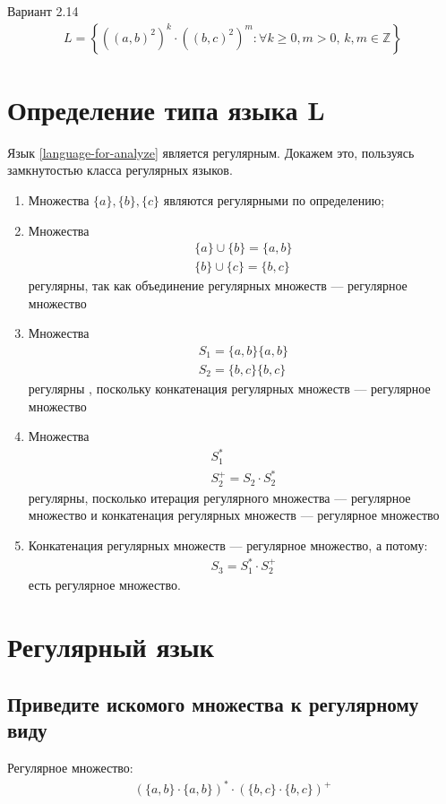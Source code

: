 Вариант 2.14
\begin{align}\label{language-for-analyze}
	L = \left\{ ((a,b)^2)^k \cdot ((b,c)^2)^m \colon \forall k \geq 0, m > 0,\, k,m \in \mathbb{Z} \right\}
\end{align}
\section{Определение типа языка L}
Язык \cref{language-for-analyze} является регулярным. Докажем это, пользуясь замкнутостью класса регулярных языков.
\begin{enumerate}
	\item Множества \(\{a\}, \{b\}, \{c\}\) являются регулярными по определению;
	\item Множества
	      \begin{align}
		      \{a\} \cup \{b\} =  \{a,b\} \\
		      \{b\} \cup \{c\} =  \{b,c\}
	      \end{align}
	      регулярны, так как объединение регулярных множеств --- регулярное множество
	\item Множества \begin{align}
		      S_1 = \{a, b\}\{a,b\} \\
		      S_2 = \{b, c\}\{b,c\}
	      \end{align}
	      регулярны , поскольку конкатенация регулярных множеств --- регулярное множество
	\item Множества
	      \begin{align}
		      S_1^* \\
		      S_2^+ = S_2 \cdot S_2^*
	      \end{align}
	      регулярны, посколько итерация регулярного множества --- регулярное множество и конкатенация регулярных множеств --- регулярное множество
	\item Конкатенация регулярных множеств --- регулярное множество, а потому:
	      \begin{align}
		      S_3 = S_1^* \cdot S_2^+
	      \end{align}
	      есть регулярное множество.
\end{enumerate}
\section{Регулярный язык}
\subsection{Приведите искомого множества к регулярному виду}
Регулярное множество:
\begin{align}
	(\{a, b\}\cdot\{a, b\})^*\cdot(\{b, c\}\cdot \{b, c\})^+
\end{align}
